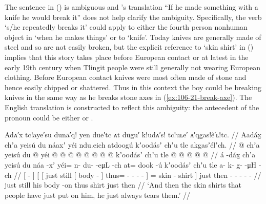 The sentence in (\lastx) is ambiguous and \citeauthor{swanton:1909}’s translation “If he made something with a knife he would break it” does not help clarify the ambiguity.
Specifically, the verb  ‘s/he repeatedly breaks it’ could apply to either the fourth person nonhuman object  in  ‘when he makes things’ or to  ‘knife’.
Today knives are generally made of steel and so are not easily broken, but the explicit reference to  ‘skin shirt’ in (\nextx) implies that this story takes place before European contact or at latest in the early 19th century when Tlingit people were still generally not wearing European clothing.
Before European contact knives were most often made of stone and hence easily chipped or shattered.
Thus in this context the boy could be breaking knives in the same way as he breaks stone axes in (\ref{ex:106-21-break-axe}).
The English translation is constructed to reflect this ambiguity: the antecedent of the pronoun  could be either  or .

\ex\label{ex:106-27-shirt-tear}%
%
\begingl
	\glpreamble	Adᴀ′x tc!aye′su dunā′q! yen duē′tc ᴀt dūgu′ k!udᴀ′s! tc!uʟe′ ᴀ′qg̣as!ê′ʟ!tc. //
	\glpreamble	Aadáx̱ chʼa yeisú du náaxʼ yéi ndu.eich atdoogú kʼoodásʼ chʼu tle akg̱asʼélʼch. //
	\gla	{}  @ {} {}
		{} {} chʼa yeisú {} du  @ {} {}
			yéi @  @ {} @ {} @ {} @ {} @ {} {}
			 @ {} @ {} kʼoodásʼ {}
		chʼu tle  @ {} @ {} @ {} @ {} @ {} //
	\glb	{} á -dáx̱ {}
		{} {} chʼa yeisú {} du náa -xʼ {}
			yéi= n- du-  -eμL -ch {} {}
			at= dook -ú kʼoodásʼ {}
		chʼu tle a- k- g̱-  -μH -ch //
	\glc	{}[  - {}]
		{}[ {}[ just still {}[  body - {}]
			thus= - -  - - \· {}]
			= skin - shirt {}]
		just then - - -  - - //
	\gld	{}  {} {}
		{} {} just still {} his body -on {}
			thus  {} {} {} {} {} {}
			 {} {} shirt {}
		just then  {} {} {} {} {} //
	\glft	‘And then the skin shirts that people have just put on him, he just always tears them.’
		//
\endgl
\xe

